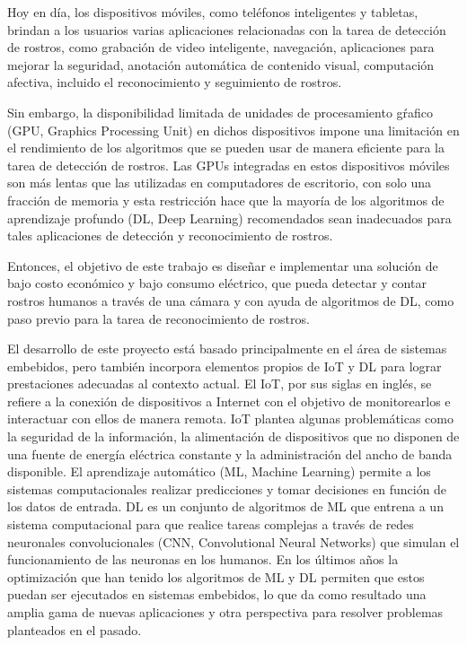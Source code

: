 \documentclass[
11pt, %
]{plan}
\begin{document}
Hoy en día, los dispositivos móviles, como teléfonos inteligentes y tabletas, brindan a los usuarios varias aplicaciones relacionadas con la tarea de detección de rostros, como grabación de video inteligente, navegación, aplicaciones para mejorar la seguridad, anotación automática de contenido visual, computación afectiva, incluido el reconocimiento y seguimiento de rostros.

Sin embargo, la disponibilidad limitada de unidades de procesamiento gŕafico (GPU, Graphics Processing Unit) en dichos dispositivos impone una limitación en el rendimiento de los algoritmos que se pueden usar de manera eficiente para la tarea de detección de rostros. Las GPUs integradas en estos dispositivos móviles son más lentas que las utilizadas en computadores de escritorio, con solo una fracción de memoria y esta restricción hace que la mayoría de los algoritmos de aprendizaje profundo (DL, Deep Learning) recomendados sean inadecuados para tales aplicaciones de detección y reconocimiento de rostros.

Entonces, el objetivo de este trabajo es diseñar e implementar una solución de bajo costo económico y bajo consumo eléctrico, que pueda detectar y contar rostros humanos a través de una cámara y con ayuda de algoritmos de DL, como paso previo para la tarea de reconocimiento de rostros.

El desarrollo de este proyecto está basado principalmente en el área de sistemas embebidos, pero también incorpora elementos propios de IoT y DL para lograr prestaciones adecuadas al contexto actual. El IoT, por sus siglas en inglés, se refiere a la conexión de dispositivos a Internet con el objetivo de monitorearlos e interactuar con ellos de manera remota. IoT plantea algunas problemáticas como la seguridad de la información, la alimentación de dispositivos que no disponen de una fuente de energía eléctrica constante y la administración del ancho de banda disponible. El aprendizaje automático (ML, Machine Learning) permite a los sistemas computacionales realizar predicciones y tomar decisiones en función de los datos de entrada. DL es un conjunto de algoritmos de ML que entrena a un sistema computacional para que realice tareas complejas a través de redes neuronales convolucionales (CNN, Convolutional Neural Networks) que simulan el funcionamiento de las neuronas en los humanos. En los últimos años la optimización que han tenido los algoritmos de ML y DL permiten que estos puedan ser ejecutados en sistemas embebidos, lo que da como resultado una amplia gama de nuevas aplicaciones y otra perspectiva para resolver problemas planteados en el pasado.
\end{document}
